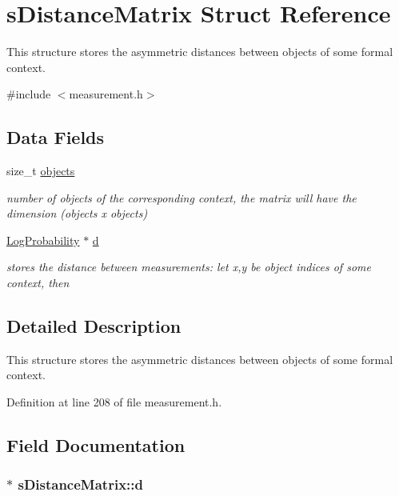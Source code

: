 \hypertarget{structsDistanceMatrix}{\section{s\-Distance\-Matrix \-Struct \-Reference}
\label{structsDistanceMatrix}
}


\-This structure stores the asymmetric distances between objects of some formal context.  




{\ttfamily \#include $<$measurement.\-h$>$}

\subsection*{\-Data \-Fields}
\begin{DoxyCompactItemize}
\item 
size\-\_\-t \hyperlink{structsDistanceMatrix_a29d599ff7b9002cc4d88f14bae637ebf}{objects}
\begin{DoxyCompactList}\small\item\em number of objects of the corresponding context, the matrix will have the dimension (objects x objects) \end{DoxyCompactList}\item 
\hyperlink{common_2measurement_8h_a0a02860cc83aa9ce63d00855bc9058e0}{\-Log\-Probability} $\ast$ \hyperlink{structsDistanceMatrix_a740d78f59a68ca470cb4c1d4ad998c05}{d}
\begin{DoxyCompactList}\small\item\em stores the distance between measurements\-: let x,y be object indices of some context, then \end{DoxyCompactList}\end{DoxyCompactItemize}


\subsection{\-Detailed \-Description}
\-This structure stores the asymmetric distances between objects of some formal context. 

\-Definition at line 208 of file measurement.\-h.



\subsection{\-Field \-Documentation}
\hypertarget{structsDistanceMatrix_a740d78f59a68ca470cb4c1d4ad998c05}{
\subsubsection[{d}]{$\ast$ {\bf s\-Distance\-Matrix\-::d}}}\label{structsDistanceMatrix_a740d78f59a68ca470cb4c1d4ad998c05}


